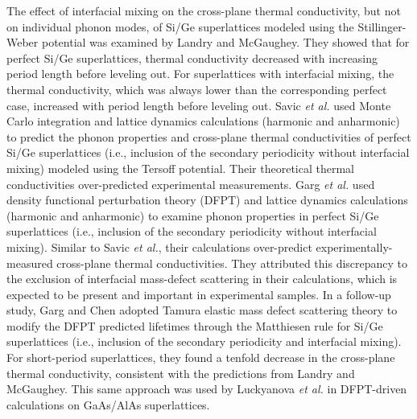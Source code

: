 \documentclass[aps,prb,preprint,preprintnumbers,amsmath,amssymb,floatfix,superscriptaddress]{revtex4}
\begin{document}
The effect of interfacial mixing on the cross-plane thermal conductivity, but not on individual phonon modes, of Si/Ge superlattices modeled using the Stillinger-Weber potential was examined by Landry and McGaughey.\cite{PhysRevB.79.075316} They showed that for perfect Si/Ge superlattices, thermal conductivity decreased with increasing period length before leveling out. For superlattices with interfacial mixing, the thermal conductivity, which was always lower than the corresponding perfect case, increased with period length before leveling out. Savic \textit{et al.} used Monte Carlo integration and lattice dynamics calculations (harmonic and anharmonic) to predict the phonon properties and cross-plane thermal conductivities of perfect Si/Ge superlattices (i.e., inclusion of the secondary periodicity without interfacial mixing) modeled using the Tersoff potential. \cite{savic:073113} Their theoretical thermal conductivities over-predicted experimental measurements. Garg \textit{et al.} used density functional perturbation theory (DFPT) and lattice dynamics calculations (harmonic and anharmonic) to examine phonon properties in perfect Si/Ge superlattices (i.e., inclusion of the secondary periodicity without interfacial mixing).\cite{doi:10.1021/nl202186y} Similar to Savic \textit{et al.}, their calculations over-predict experimentally-measured cross-plane thermal conductivities. They attributed this discrepancy to the exclusion of interfacial mass-defect scattering in their calculations, which is expected to be present and important in experimental samples. In a follow-up study, Garg and Chen adopted Tamura elastic mass defect scattering theory \cite{tamura_isotope_1983} to modify the DFPT predicted lifetimes through the Matthiesen rule for Si/Ge superlattices (i.e., inclusion of the secondary periodicity and interfacial mixing).\cite{PhysRevB.87.140302} For short-period superlattices, they found a tenfold decrease in the cross-plane thermal conductivity, consistent with the predictions from Landry and McGaughey.\cite{PhysRevB.79.075316} This same approach was used by Luckyanova \textit{et al.} \cite{Luckyanova16112012} in DFPT-driven calculations on GaAs/AlAs superlattices.
\end{document}
